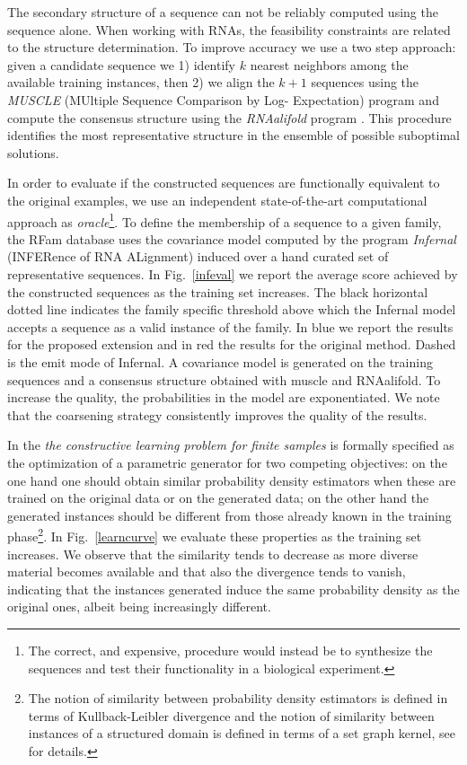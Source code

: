\documentclass[a4paper]{esannV2}
\begin{document}
\color{blue}
The secondary structure of a sequence can not be reliably computed
using the sequence alone.
\color{black} \color{red}
When working with RNAs, the feasibility constraints are related to the
structure determination. \color{black}
To improve accuracy we use a two step approach:
given a candidate sequence we 1) identify $k$ nearest neighbors among the
available training instances, then 2) we align the $k+1$ sequences using the
\emph{MUSCLE} (MUltiple Sequence Comparison by Log- Expectation) program
\citep{muscle} and compute the consensus structure using the \emph{RNAalifold}
program \citep{rnaalifold}. This procedure identifies
the most representative structure in the ensemble of possible suboptimal
solutions.

In order to evaluate if the constructed sequences are functionally equivalent
to the original examples, we use an independent state-of-the-art computational
approach as {\em oracle}\footnote{The correct, and expensive, procedure would
instead be to synthesize the sequences and test their functionality in a
biological experiment.}. To define the membership of a sequence to a given
family, the RFam database uses the covariance model computed by the program
\emph{Infernal} (INFERence of RNA ALignment) \citep{infernal} induced over a
hand curated set of representative sequences.
In Fig.~\ref{infeval} we report the average score achieved by the constructed
sequences as the training set increases. The black horizontal dotted line indicates
the family specific threshold above which the Infernal model accepts a
sequence as a valid instance of the family. In blue we report the results for
the proposed extension and in red the results for the original method.
\color{blue}
Dashed is the emit mode of Infernal. A covariance 
model is generated on the training sequences and a consensus structure obtained 
with muscle and RNAalifold. To increase the quality,
the probabilities in the model are exponentiated. 
\color{black}
We note that the coarsening strategy consistently improves the quality of the results. 

In \cite{costa16} the \emph{the constructive learning problem for finite
samples} is formally specified as the optimization of a parametric generator
for two competing objectives: on the one hand one should obtain similar
probability density estimators when these are trained on the original data or
on the generated data; on the other hand the generated instances should be
different from those already known in the training phase\footnote{The notion
of similarity between probability density estimators is defined in terms of
Kullback-Leibler divergence and the notion of similarity between instances of
a structured domain is defined in terms of a set graph kernel, see
\citep{costa16} for details.}. In Fig.~\ref{learncurve} we evaluate these
properties as the training set increases. We observe that the similarity tends
to decrease as more diverse material becomes available and that also the
divergence tends to vanish, indicating that the instances generated induce the
same probability density as the original ones, albeit being increasingly
different.
\end{document}
